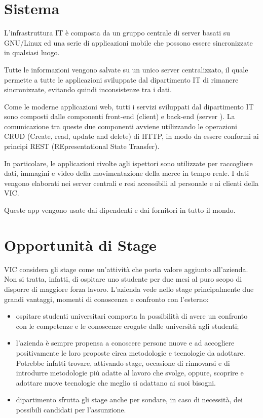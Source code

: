 \section{Sistema}
	L'infrastruttura IT è composta da un gruppo centrale di server basati su GNU/Linux ed una serie di applicazioni mobile che possono essere sincronizzate in 
	qualsiasi luogo.
	
	Tutte le informazioni vengono salvate su un unico server centralizzato, il quale permette
	a tutte le applicazioni sviluppate dal dipartimento IT di rimanere sincronizzate,
	evitando quindi inconsistenze tra i dati.
	
	Come le moderne applicazioni web, tutti i servizi sviluppati dal dipartimento IT sono
	composti dalle componenti front-end (client) e back-end (server ). La comunicazione tra
	queste due componenti avviene utilizzando le operazioni CRUD (Create, read, update
	and delete) di HTTP, in modo da essere conformi ai principi REST (REpresentational
	State Transfer).
	
	In particolare, le applicazioni rivolte agli ispettori sono utilizzate per raccogliere dati, 
	immagini e video della movimentazione della merce in tempo reale.
	I dati vengono elaborati nei server centrali e resi accessibili al personale e ai clienti della VIC.
	 
	Queste app vengono usate dai dipendenti e dai fornitori in tutto il mondo.
	

	
	

\section{Opportunità di Stage} 
	VIC considera gli stage come un’attività che porta valore aggiunto all’azienda.
	Non si tratta, infatti, di ospitare uno studente per due mesi al puro scopo di disporre di
	maggiore forza lavoro. L’azienda vede nello stage principalmente due grandi vantaggi,
	momenti di conoscenza e confronto con l’esterno:
	\begin{itemize}
		\item ospitare studenti universitari comporta la possibilità di avere un confronto con
			le competenze e le conoscenze erogate dalle università agli studenti;
		\item l’azienda è sempre propensa a conoscere persone nuove e ad accogliere positivamente
			le loro proposte circa metodologie e tecnologie da adottare. Potrebbe
			infatti trovare, attivando stage, occasione di rinnovarsi e di introdurre metodologie
			più adatte al lavoro che svolge, oppure, scoprire e adottare nuove tecnologie
			che meglio si adattano ai suoi bisogni.
		\item dipartimento sfrutta gli stage anche per sondare, in caso di necessità, dei possibili
		candidati per l’assunzione.
	\end{itemize}
